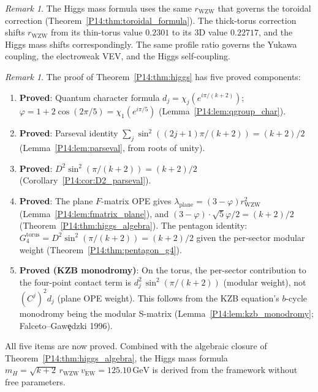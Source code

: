 \documentclass[11pt,a4paper]{article}
\theoremstyle{definition}
\theoremstyle{remark}
\newtheorem{remark}[theorem]{Remark}
\newcommand{\vp}{\varphi}
\newcommand{\vEW}{v_{\mathrm{EW}}}
\newcommand{\mH}{m_H}
\begin{document}
\begin{remark}
\label{P14:rem:higgs_consistency}
The Higgs mass formula uses the same $r_{\mathrm{WZW}}$ that governs
the toroidal correction (Theorem~\ref{P14:thm:toroidal_formula}).
The thick-torus correction shifts $r_{\mathrm{WZW}}$ from its
thin-torus value $0.2301$ to its 3D value $0.22717$, and the Higgs
mass shifts correspondingly. The same profile ratio governs
the Yukawa coupling, the electroweak VEV, and the Higgs self-coupling.
\end{remark}

\begin{remark}
\label{P14:rem:higgs_path}
The proof of Theorem~\ref{P14:thm:higgs} has five proved components:
\begin{enumerate}[noitemsep,label=(\roman*)]
\item \textbf{Proved}: Quantum character formula $d_j = \chi_j(e^{i\pi/(k+2)})$;
  $\vp = 1+2\cos(2\pi/5) = \chi_1(e^{i\pi/5})$
  (Lemma~\ref{P14:lem:qgroup_char}).
\item \textbf{Proved}: Parseval identity
  $\sum_j\sin^2((2j+1)\pi/(k+2)) = (k+2)/2$
  (Lemma~\ref{P14:lem:parseval}, from roots of unity).
\item \textbf{Proved}: $D^2\sin^2(\pi/(k+2)) = (k+2)/2$
  (Corollary~\ref{P14:cor:D2_parseval}).
\item \textbf{Proved}: The plane $F$-matrix OPE gives
  $\lambda_{\mathrm{plane}} = (3-\vp)r_{\mathrm{WZW}}^2$
  (Lemma~\ref{P14:lem:fmatrix_plane}),
  and $(3-\vp)\cdot\sqrt{5}\vp/2 = (k+2)/2$
  (Theorem~\ref{P14:thm:higgs_algebra}).
  The pentagon identity: $G_4^{\mathrm{torus}} = D^2\sin^2(\pi/(k+2)) = (k+2)/2$
  given the per-sector modular weight
  (Theorem~\ref{P14:thm:pentagon_g4}).
\item \textbf{Proved (KZB monodromy)}: On the torus, the per-sector
  contribution to the four-point contact term is
  $d_j^2\,\sin^2(\pi/(k+2))$ (modular weight),
  not $(C^j)^2 d_j$ (plane OPE weight).
  This follows from the KZB equation's $b$-cycle monodromy being
  the modular S-matrix (Lemma~\ref{P14:lem:kzb_monodromy};
  Falceto--Gaw\c{e}dzki 1996).
\end{enumerate}
All five items are now proved.  Combined with the algebraic closure
of Theorem~\ref{P14:thm:higgs_algebra}, the Higgs mass formula
$\mH = \sqrt{k+2}\,r_{\mathrm{WZW}}\,\vEW = 125.10\,\mathrm{GeV}$
is derived from the framework without free parameters.
\end{remark}


\end{document}
